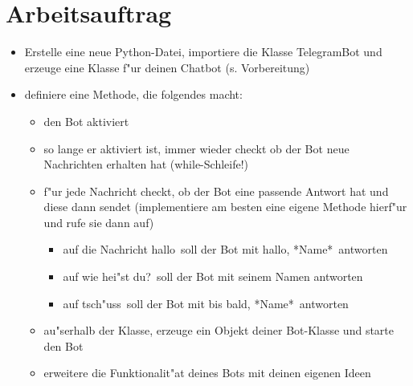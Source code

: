 \documentclass[a4paper]{article}
\begin{document}
\section{Arbeitsauftrag}
\begin{itemize}
	\item Erstelle eine neue Python-Datei, importiere die Klasse TelegramBot und erzeuge eine Klasse f"ur deinen Chatbot (s. Vorbereitung)
	\item definiere eine Methode, die folgendes macht:
		\begin{itemize}
			\item den Bot aktiviert
			\item so lange er aktiviert ist, immer wieder checkt ob der Bot neue Nachrichten erhalten hat (while-Schleife!)
			\item f"ur jede Nachricht checkt, ob der Bot eine passende Antwort hat und diese dann sendet (implementiere am besten eine eigene Methode hierf"ur und rufe sie dann auf)
			\begin{itemize}
				\item auf die Nachricht \glqq hallo\grqq\  soll der Bot mit \glqq hallo, *Name*\grqq\ antworten
				\item auf \glqq  wie hei"st du?\grqq\ soll der Bot mit seinem Namen antworten
				\item auf \glqq tsch"uss\grqq\ soll der Bot mit \glqq bis bald, *Name*\grqq\  antworten
			\end{itemize}
			\item au"serhalb der Klasse, erzeuge ein Objekt deiner Bot-Klasse und starte den Bot
			\item erweitere die Funktionalit"at deines Bots mit deinen eigenen Ideen
		\end{itemize}
\end{itemize}
\end{document}
